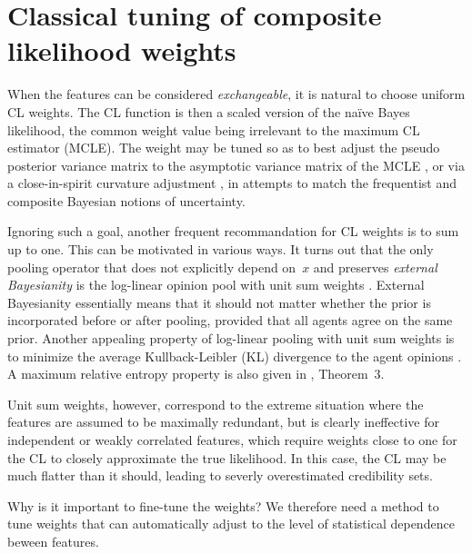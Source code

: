 \documentclass[english]{scrartcl}
\begin{document}
\section{Classical tuning of composite likelihood weights}

When the features can be considered {\em exchangeable}, it is natural to choose uniform CL weights. The CL function is then a scaled version of the na\"ive Bayes likelihood, the common weight value being irrelevant to the maximum CL estimator (MCLE). The weight may be tuned so as to best adjust the pseudo posterior variance matrix to the asymptotic variance matrix of the MCLE \cite{Pauli-11}, or via a close-in-spirit curvature adjustment \cite{Ribatet-12}, in attempts to match the frequentist and composite Bayesian notions of uncertainty.

Ignoring such a goal, another frequent recommandation for CL weights is to sum up to one. This can be motivated in various ways. It turns out that the only pooling operator that does not explicitly depend on~$x$ and preserves {\em external Bayesianity} is the log-linear opinion pool with unit sum weights \cite{Genest-86b}. External Bayesianity essentially means that it should not matter whether the prior is incorporated before or after pooling, provided that all agents agree on the same prior. Another appealing property of log-linear pooling with unit sum weights is to minimize the average Kullback-Leibler (KL) divergence to the agent opinions \cite{Garg-04}. A maximum relative entropy property is also given in \cite{Wang-14}, Theorem~3.

Unit sum weights, however, correspond to the extreme situation where the features are assumed to be maximally redundant, but is clearly ineffective for independent or weakly correlated features, which require weights close to one for the CL to closely approximate the true likelihood. In this case, the CL may be much flatter than it should, leading to severly overestimated credibility sets.

{\color{red} Why is it important to fine-tune the weights?}
We therefore need a method to tune weights that can automatically adjust to the level of statistical dependence beween features.

\end{document}
